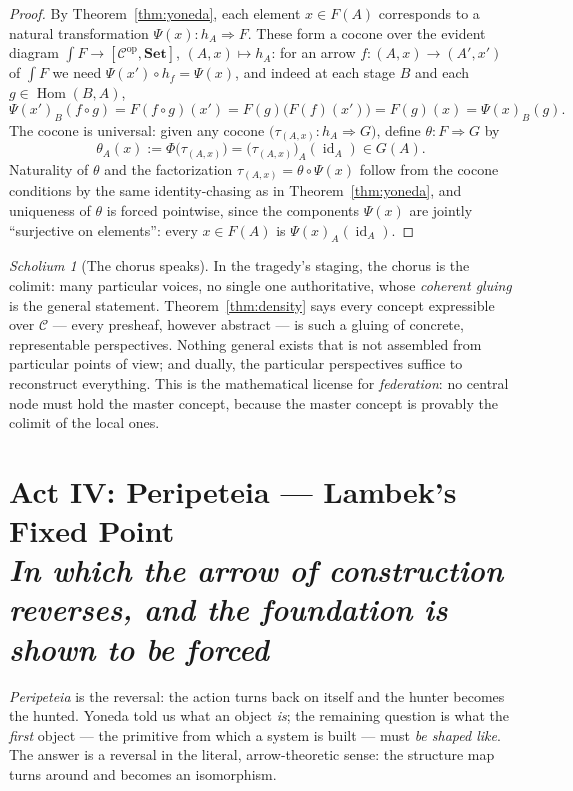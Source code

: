 \documentclass[11pt]{article}
\theoremstyle{plain}
\theoremstyle{definition}
\theoremstyle{remark}
\newtheorem{scholium}[theorem]{Scholium}
\newcommand{\C}{\mathcal{C}}
\newcommand{\Set}{\mathbf{Set}}
\newcommand{\Hom}{\operatorname{Hom}}
\newcommand{\id}{\operatorname{id}}
\newcommand{\op}{\mathrm{op}}
\newcommand{\El}{\textstyle\int}
\newcommand{\act}[2]{\section{#1 \\ {\normalsize\normalfont\itshape #2}}}
\begin{document}
\begin{proof}
By Theorem~\ref{thm:yoneda}, each element $x \in F(A)$ corresponds to a natural transformation $\Psi(x)\colon h_A \Rightarrow F$. These form a cocone over the evident diagram $\El F \to [\C^{\op},\Set]$, $(A,x) \mapsto h_A$: for an arrow $f\colon (A,x) \to (A',x')$ of $\El F$ we need $\Psi(x') \circ h_f = \Psi(x)$, and indeed at each stage $B$ and each $g \in \Hom(B,A)$,
\[
\Psi(x')_B(f \circ g) = F(f\circ g)(x') = F(g)\bigl(F(f)(x')\bigr) = F(g)(x) = \Psi(x)_B(g).
\]
The cocone is universal: given any cocone $\bigl(\tau_{(A,x)}\colon h_A \Rightarrow G\bigr)$, define $\theta\colon F \Rightarrow G$ by
\[
\theta_A(x) := \Phi\bigl(\tau_{(A,x)}\bigr) = \bigl(\tau_{(A,x)}\bigr)_A(\id_A) \in G(A).
\]
Naturality of $\theta$ and the factorization $\tau_{(A,x)} = \theta \circ \Psi(x)$ follow from the cocone conditions by the same identity-chasing as in Theorem~\ref{thm:yoneda}, and uniqueness of $\theta$ is forced pointwise, since the components $\Psi(x)$ are jointly ``surjective on elements'': every $x \in F(A)$ is $\Psi(x)_A(\id_A)$.
\end{proof}

\begin{scholium}[The chorus speaks]
In the tragedy's staging, the chorus is the colimit: many particular voices, no single one authoritative, whose \emph{coherent gluing} is the general statement. Theorem~\ref{thm:density} says every concept expressible over $\C$ --- every presheaf, however abstract --- is such a gluing of concrete, representable perspectives. Nothing general exists that is not assembled from particular points of view; and dually, the particular perspectives suffice to reconstruct everything. This is the mathematical license for \emph{federation}: no central node must hold the master concept, because the master concept is provably the colimit of the local ones.
\end{scholium}

\act{Act IV: Peripeteia --- Lambek's Fixed Point}{In which the arrow of construction reverses, and the foundation is shown to be forced}

\emph{Peripeteia} is the reversal: the action turns back on itself and the hunter becomes the hunted. Yoneda told us what an object \emph{is}; the remaining question is what the \emph{first} object --- the primitive from which a system is built --- must \emph{be shaped like}. The answer is a reversal in the literal, arrow-theoretic sense: the structure map turns around and becomes an isomorphism.
\end{document}
